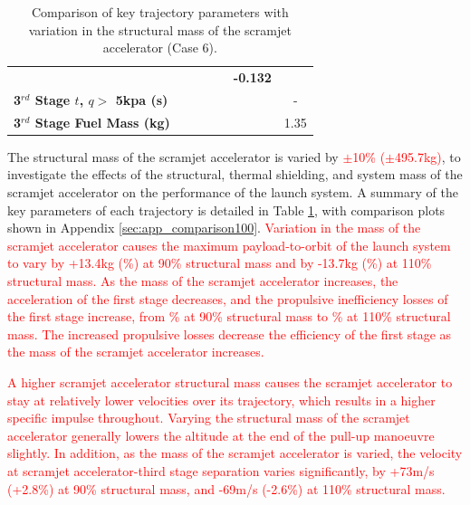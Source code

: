 \begin{table}[ht]
\begin{tabular}{l c c c c c c}
		& \textbf{\thirddExergyEffmSPARTANNinetyFiveNoReturn}
		& \textbf{\thirddExergyEffmSPARTANStandardNoReturn}
		& \textbf{\thirddExergyEffmSPARTANOneHundredFiveNoReturn}
		& \textbf{\thirddExergyEffmSPARTANOneHundredTenNoReturn}
		& \textbf{-0.132}
		\\
		\textbf{3$^{rd}$ Stage $t$, $q >$ 5kpa (s)}
		& \thirdqOverFivemSPARTANNinetyNoReturn
		& \thirdqOverFivemSPARTANNinetyFiveNoReturn
		& \thirdqOverFivemSPARTANStandardNoReturn
		& \thirdqOverFivemSPARTANOneHundredFiveNoReturn
		& \thirdqOverFivemSPARTANOneHundredTenNoReturn
		& -
		\\
		\textbf{3$^{rd}$ Stage Fuel Mass (kg)}
		& \thirdmFuelmSPARTANNinetyNoReturn
		& \thirdmFuelmSPARTANNinetyFiveNoReturn
		& \thirdmFuelmSPARTANStandardNoReturn
		& \thirdmFuelmSPARTANOneHundredFiveNoReturn
		& \thirdmFuelmSPARTANOneHundredTenNoReturn
		&1.35
		\\
		\hline 
	\end{tabular}  
\caption{Comparison of key trajectory parameters with variation in the structural mass of the scramjet accelerator (Case 6).}
\label{tab:comparison100}
	
\end{table}


The structural mass of the scramjet accelerator is varied by \textcolor{red}{$\pm$10\% ($\pm$495.7kg)}, to investigate the effects of the structural, thermal shielding, and system mass of the scramjet accelerator on the performance of the launch system. A summary of the key parameters of each trajectory is detailed in Table \ref{tab:comparison100}, with comparison plots shown in Appendix \ref{sec:app_comparison100}.
\textcolor{red}{Variation in the mass of the scramjet accelerator causes the maximum payload-to-orbit of the launch system to vary by +13.4kg (\PayloadVarmSPARTANNinetyNoReturn\%) at 90\% structural mass and by -13.7kg (\PayloadVarmSPARTANOneHundredTenNoReturn\%) at 110\% structural mass. 
 As the mass of the scramjet accelerator increases, the acceleration of the first stage decreases, and the propulsive inefficiency losses of the first stage increase, from \PlossonemSPARTANNinetyNoReturn\% at 90\% structural mass to \PlossonemSPARTANOneHundredTenNoReturn\% at 110\% structural mass. The increased propulsive losses decrease the efficiency of the first stage as the mass of the scramjet accelerator increases.}

\textcolor{red}{
A higher scramjet accelerator structural mass causes the scramjet accelerator to stay at relatively lower velocities over its trajectory, which results in a higher specific impulse throughout. 
Varying the structural mass of the scramjet accelerator generally lowers the altitude at the end of the pull-up manoeuvre slightly. In addition, as the mass of the scramjet accelerator is varied, the velocity at scramjet accelerator-third stage separation varies significantly, by +73m/s (+2.8\%) at 90\% structural mass, and -69m/s (-2.6\%) at 110\% structural mass. }

